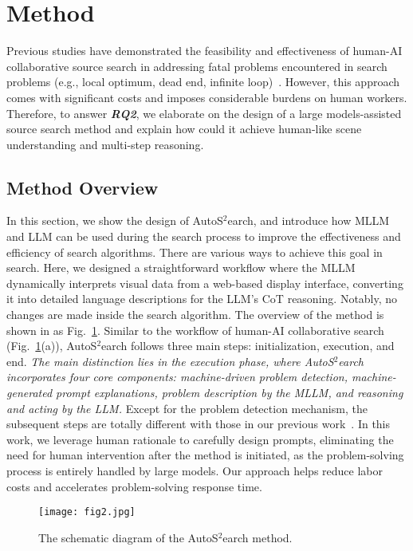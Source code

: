 \section{Method}
Previous studies have demonstrated the feasibility and effectiveness of human-AI collaborative source search in addressing fatal problems encountered in search problems (e.g., local optimum, dead end, infinite loop)~\cite{zhao2022crowd,zhao2023leveraging}. However, this approach comes with significant costs and imposes considerable burdens on human workers. Therefore, to answer \textbf{\textit{RQ2}}, we elaborate on the design of a large models-assisted source search method and explain how could it achieve human-like scene understanding and multi-step reasoning.

\subsection{Method Overview}
In this section, we show the design of AutoS$^2$earch, and introduce how MLLM and LLM can be used during the search process to improve the effectiveness and efficiency of search algorithms. There are various ways to achieve this goal in search. Here, we designed a straightforward workflow where the MLLM dynamically interprets visual data from a web-based display interface, converting it into detailed language descriptions for the LLM's CoT reasoning. Notably, no changes are made inside the search algorithm. The overview of the method is shown in as Fig.~\ref{fig:workflow}. Similar to the workflow of human-AI collaborative search (Fig.~\ref{fig:workflow}(a)), AutoS$^2$earch follows three main steps: initialization, execution, and end.\textit{ The main distinction lies in the execution phase, where AutoS$^2$earch incorporates four core components: machine-driven problem detection, machine-generated prompt explanations, problem description by the MLLM, and reasoning and acting by the LLM.} Except for the problem detection mechanism, the subsequent steps are totally different with those in our previous work~\cite{zhao2023leveraging}. In this work, we leverage human rationale to carefully design prompts, eliminating the need for human intervention after the method is initiated, as the problem-solving process is entirely handled by large models. Our approach helps reduce labor costs and accelerates problem-solving response time.  



\begin{figure}[htbp]
    \centering
    \texttt{[image: fig2.jpg]}
    \caption{The schematic diagram of the AutoS$^2$earch method.}
    \label{fig:workflow}
\end{figure}


